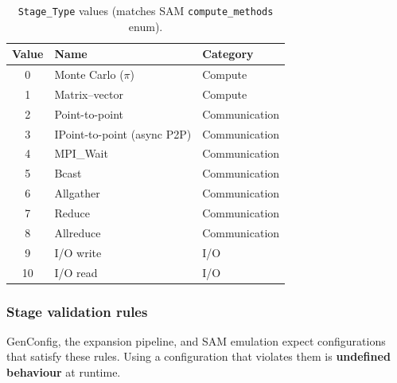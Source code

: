 \begin{table}[H]
\centering
\small
\begin{tabular}{@{}cll@{}}
\toprule
\textbf{Value} & \textbf{Name} & \textbf{Category} \\
\midrule
0 & Monte Carlo ($\pi$) & Compute \\
1 & Matrix--vector & Compute \\
2 & Point-to-point & Communication \\
3 & IPoint-to-point (async P2P) & Communication \\
4 & MPI\_Wait & Communication \\
5 & Bcast & Communication \\
6 & Allgather & Communication \\
7 & Reduce & Communication \\
8 & Allreduce & Communication \\
9 & I/O write & I/O \\
10 & I/O read & I/O \\
\bottomrule
\end{tabular}
\caption{\texttt{Stage\_Type} values (matches SAM \texttt{compute\_methods} enum).}
\label{tab:stage-types}
\end{table}

\subsubsection{Stage validation rules}
\label{subsubsection:stage-validation}

GenConfig, the expansion pipeline, and SAM emulation expect configurations that satisfy these rules. Using a configuration that violates them is \textbf{undefined behaviour} at runtime.

